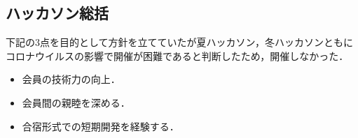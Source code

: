 \subsection*{ハッカソン総括}

下記の3点を目的として方針を立てていたが夏ハッカソン，冬ハッカソンともにコロナウイルスの影響で開催が困難であると判断したため，開催しなかった．
\begin{itemize}
    \item 会員の技術力の向上．
    \item 会員間の親睦を深める．
    \item 合宿形式での短期開発を経験する．
\end{itemize}

